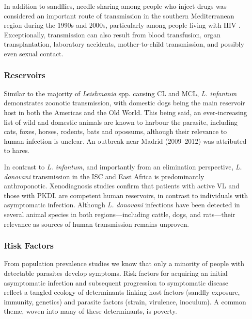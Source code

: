 In addition to sandflies, needle sharing among people who inject drugs was considered an important route of transmission in the southern Mediterranean region during the 1990s and 2000s, particularly among people living with HIV \cite{alvar1997}. Exceptionally, transmission can also result from blood transfusion, organ transplantation, laboratory accidents\cite{farrar2023manson}, mother-to-child transmission\cite{pagliano2005}, and possibly even sexual contact\cite{guedes2020, symmers1960}.

\subsubsection{Reservoirs}

Similar to the majority of \textit{Leishmania} spp. causing CL and MCL, \textit{L. infantum} demonstrates zoonotic transmission, with domestic dogs being the main reservoir host in both the Americas and the Old World. This being said, an ever-increasing list of wild and domestic animals are known to harbour the parasite, including cats, foxes, horses, rodents, bats and opossums, although their relevance to human infection is unclear\cite{alcover2020, ratzlaff2023}. An outbreak near Madrid (2009--2012) was attributed to hares\cite{molina2012}.

In contrast to \textit{L. infantum}, and importantly from an elimination perspective, \textit{L. donovani} transmission in the ISC and East Africa is predominantly anthroponotic. Xenodiagnosis studies confirm that patients with active VL and those with PKDL are competent human reservoirs, in contrast to individuals with asymptomatic infection\cite{singh2021, mondal2019}. Although \textit{L. donovani} infections have been detected in several animal species in both regions—including cattle, dogs, and rats—their relevance as sources of human transmission remains unproven\cite{kushwaha2024, jones2021}.

\subsubsection{Risk Factors}

From population prevalence studies we know that only a minority of people with detectable parasites develop symptoms\cite{pederiva2022, burza2018}. Risk factors for acquiring an initial asymptomatic infection and subsequent progression to symptomatic disease reflect a tangled ecology of determinants linking host factors (sandfly exposure, immunity, genetics) and parasite factors (strain, virulence, inoculum). A common theme, woven into many of these determinants, is poverty.

